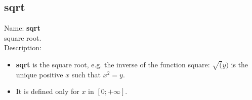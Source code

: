 \subsection{ sqrt }
\noindent Name: \textbf{sqrt}\\
square root.\\

\noindent Description: \begin{itemize}

\item \textbf{sqrt} is the square root, e.g. the inverse of the function square: $\sqrt(y)$
   is the unique positive $x$ such that $x^2=y$.

\item It is defined only for $x$ in $[0;+\infty]$.
\end{itemize}
